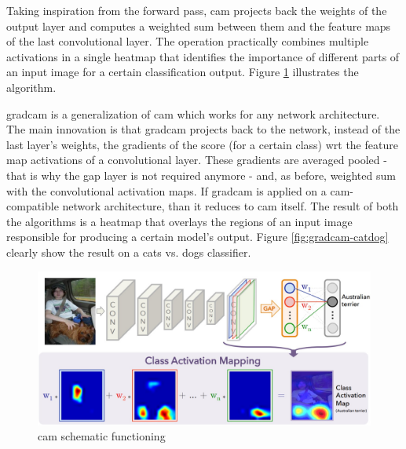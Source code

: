 Taking inspiration from the forward pass, \gls{cam} projects back the weights of the output layer and computes a weighted sum between them and the feature maps of the last convolutional layer. The operation practically combines multiple activations in a single heatmap that identifies the importance of different parts of an input image for a certain classification output. Figure \ref{fig:cam-schema} illustrates the algorithm. 

\medskip

\gls{gradcam} is a generalization of \gls{cam} which works for any network architecture. The main innovation is that \gls{gradcam} projects back to the network, instead of the last layer's weights, the gradients of the score (for a certain class) \gls{wrt} the feature map activations of a convolutional layer. These gradients are averaged pooled - that is why the \gls{gap} layer is not required anymore - and, as before, weighted sum with the convolutional activation maps. If \gls{gradcam} is applied on a \gls{cam}-compatible network architecture, than it reduces to \gls{cam} itself. The result of both the algorithms is a heatmap that overlays the regions of an input image responsible for producing a certain model's output. Figure \ref{fig:gradcam-catdog} clearly show the result on a cats vs. dogs classifier.

\begin{figure}[H]
	\centering
	\includegraphics[width=1\textwidth]{"contents/images/02-cam"}
	\caption[\gls{cam} schematic functioning]{\gls{cam} schematic functioning \cite{zhou2015learning}}
	\label{fig:cam-schema}
\end{figure}


